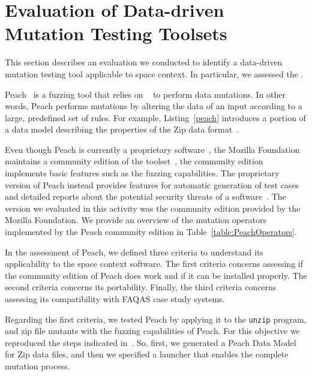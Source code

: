 \clearpage
\section{Evaluation of Data-driven Mutation Testing Toolsets}
\label{sec:toolsComparisonDataDriven}

This section describes an evaluation we conducted to identify a data-driven mutation testing tool applicable to space context. In particular, we assessed the .






Peach~\cite{PeachMozilla,PeachFuzzer} is a fuzzing tool that relies on ~\cite{pham2016model,spike} to perform data mutations. In other words, Peach performs mutations by altering the data of an input according to a large, predefined set of rules. For example, Listing~\ref{peach} introduces a portion of a data model describing the properties of the Zip data format~\cite{zipformat}. 

Even though Peach is currently a proprietary software~\cite{PeachFuzzer}, the Mozilla Foundation maintains a community edition of the toolset~\cite{PeachMozilla}, the community edition implements basic features such as the fuzzing capabilities. The proprietary version of Peach instead provides features for automatic generation of test cases and detailed reports about the potential security threats of a software~\cite{PeachFuzzer}. The version we evaluated in this activity was the community edition provided by the Mozilla Foundation. We provide an overview of the mutation operators implemented by the Peach community edition in Table~\ref{table:PeachOperators}.


In the assessment of Peach, we defined three criteria to understand its applicability to the space context software. The first criteria concerns assessing if the community edition of Peach does work and if it can be installed properly. The second criteria concerns its portability. Finally, the third criteria concerns assessing its compatibility with FAQAS case study systems.

Regarding the first criteria, we tested Peach by applying it to the \texttt{unzip} program, and zip file mutants with the fuzzing capabilities of Peach. For this objective we reproduced the steps indicated in~\cite{zipexample}. So, first, we generated a Peach Data Model for Zip data files, and then we specified a launcher that enables the complete mutation process.

